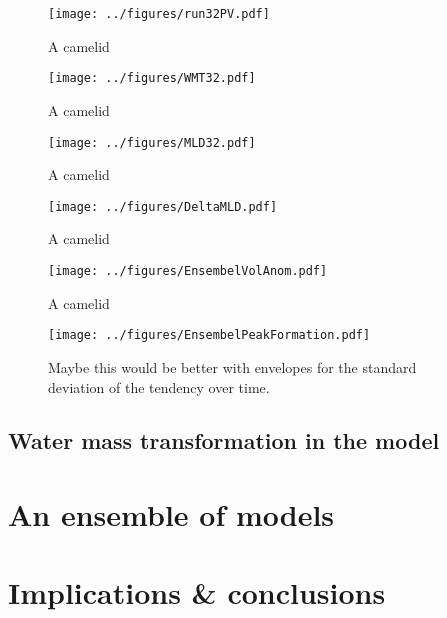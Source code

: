 \begin{figure} 
    \centering
    \texttt{[image: ../figures/run32PV.pdf]}
    \caption{A camelid}
    \label{fig:EnsStandardPV}
\end{figure}

\begin{figure} 
    \centering
    \texttt{[image: ../figures/WMT32.pdf]}
    \caption{A camelid}
    \label{fig:EnsStandardWMT}
\end{figure}

\begin{figure} 
    \centering
    \texttt{[image: ../figures/MLD32.pdf]}
    \caption{A camelid}
    \label{fig:EnsStandardMLD}
\end{figure}

\begin{figure} 
    \centering
    \texttt{[image: ../figures/DeltaMLD.pdf]}
    \caption{A camelid}
    \label{fig:DeltaMLD}
\end{figure}

\begin{figure} 
    \centering
    \texttt{[image: ../figures/EnsembelVolAnom.pdf]}
    \caption{A camelid}
    \label{fig:EnsVolAnom}
\end{figure}

\begin{figure} 
    \centering
    \texttt{[image: ../figures/EnsembelPeakFormation.pdf]}
    \caption{Maybe this would be better with envelopes for the standard deviation of the tendency over time.}
    \label{fig:EnsPkFormation}
\end{figure}

\subsection{Water mass transformation in the model}

\section{An ensemble of models}

\section{Implications \& conclusions}
